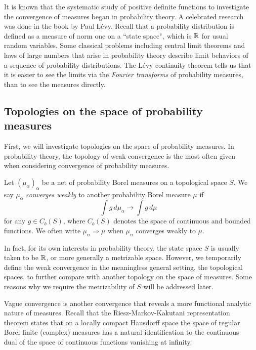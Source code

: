 \documentclass[a4paper]{article}
\begin{document}
It is known that the systematic study of positive definite functions to investigate the convergence of measures began in probability theory.
A celebrated research was done in the book \cite{levy1925calcul} by Paul L\'evy.
Recall that a probability distribution is defined as a measure of norm one on a ``state space'', which is $\mathbb{R}$ for usual random variables.
Some classical problems including central limit theorems and laws of large numbers that arise in probability theory describe limit behaviors of a sequence of probability distributions.
The L\'evy continuity theorem tells us that it is easier to see the limits via the \emph{Fourier transforms} of probability measures, than to see the measures directly.


\subsection{Topologies on the space of probability measures}

First, we will investigate topologies on the space of probability measures.
In probability theory, the topology of weak convergence is the most often given when considering convergence of probability measures.

\begin{defn}
Let $(\mu_\alpha)_\alpha$ be a net of probability Borel measures on a topological space $S$.
We say $\mu_\alpha$ \emph{converges weakly} to another probability Borel measure $\mu$ if
\[\int g\,d\mu_\alpha\to\int g\,d\mu\]
for any $g\in C_b(S)$, where $C_b(S)$ denotes the space of continuous and bounded functions.
We often write $\mu_\alpha\Rightarrow\mu$ when $\mu_\alpha$ converges weakly to $\mu$.
\end{defn}

In fact, for its own interests in probability theory, the state space $S$ is usually taken to be $\mathbb{R}$, or more generally a metrizable space.
However, we temporarily define the weak convergence in the meaningless general setting, the topological spaces, to further compare with another topology on the space of measures.
Some reasons why we require the metrizability of $S$ will be addressed later.

Vague convergence is another convergence that reveals a more functional analytic nature of measures.
Recall that the Riesz-Markov-Kakutani representation theorem states that on a locally compact Hausdorff space the space of regular Borel finite (complex) measures has a natural identification to the continuous dual of the space of continuous functions vanishing at infinity.
\end{document}
